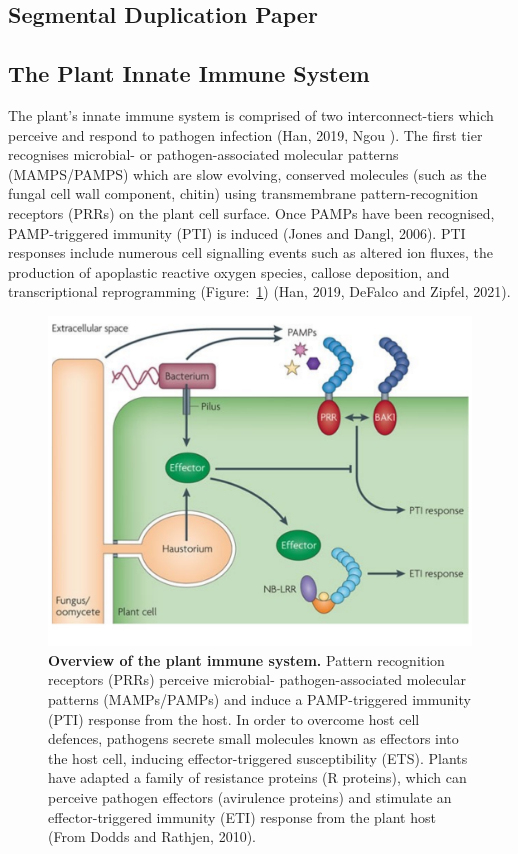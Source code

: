 \subsection{Segmental Duplication Paper}

\subsection{The Plant Innate Immune System}

The plant’s innate immune system is comprised of two interconnect-tiers which perceive and respond to pathogen infection (Han, 2019, Ngou ). The first tier recognises microbial- or pathogen-associated molecular patterns (MAMPS/PAMPS) which are slow evolving, conserved molecules (such as the fungal cell wall component, chitin) using transmembrane pattern-recognition receptors (PRRs) on the plant cell surface. Once PAMPs have been recognised, PAMP-triggered immunity (PTI) is induced (Jones and Dangl, 2006). PTI responses include numerous cell signalling events such as altered ion fluxes, the production of apoplastic reactive oxygen species, callose deposition, and transcriptional reprogramming (Figure:~\ref{fig:PlantImmuneSystem}) (Han, 2019, DeFalco and Zipfel, 2021). 

\begin{figure}[h!]
    \centering
    \includegraphics[width=14cm]{Figures/DoddsArticleModel.pdf}
    \caption[Overview of the plant immune system.]{\textbf{Overview of the plant immune system.} Pattern recognition receptors (PRRs) perceive microbial- pathogen-associated molecular patterns (MAMPs/PAMPs) and induce a PAMP-triggered immunity (PTI) response from the host. In order to overcome host cell defences, pathogens secrete small molecules known as effectors into the host cell, inducing effector-triggered susceptibility (ETS). Plants have adapted a family of resistance proteins (R proteins), which can perceive pathogen effectors (avirulence proteins) and stimulate an effector-triggered immunity (ETI) response from the plant host (From Dodds and Rathjen, 2010).}
    \label{fig:PlantImmuneSystem}
\end{figure}

